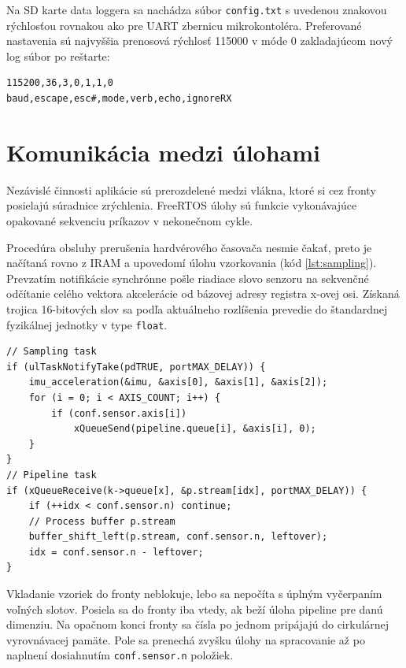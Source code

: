 Na SD karte data loggera sa nachádza súbor \verb|config.txt| s uvedenou znakovou rýchlosťou
rovnakou ako pre UART zbernicu mikrokontoléra. Preferované nastavenia sú najvyššia prenosová rýchlosť 115000
v móde 0 zakladajúcom nový log súbor po reštarte:
\begin{small}
\begin{Verbatim}[frame=single, baselinestretch=1.1]
115200,36,3,0,1,1,0
baud,escape,esc#,mode,verb,echo,ignoreRX
\end{Verbatim}
\end{small}

\section{Komunikácia medzi úlohami}
Nezávislé činnosti aplikácie sú prerozdelené medzi vlákna, ktoré si cez fronty posielajú súradnice zrýchlenia.
FreeRTOS úlohy sú funkcie vykonávajúce opakované sekvenciu príkazov v nekonečnom cykle.

Procedúra obsluhy prerušenia hardvérového časovača nesmie čakať, preto je načítaná rovno z IRAM a upovedomí úlohu vzorkovania
(kód \ref{lst:sampling}). Prevzatím notifikácie synchrónne pošle riadiace slovo senzoru na sekvenčné odčítanie celého vektora
akcelerácie od bázovej adresy registra x-ovej osi. Získaná trojica 16-bitových slov sa podľa aktuálneho rozlíšenia prevedie
do štandardnej fyzikálnej jednotky v type \verb|float|.

\begin{lstlisting}[style=cstyle,caption=Posielanie vzoriek medzi úlohami cez fronty,label={lst:sampling},
 morekeywords={ulTaskNotifyTake,xQueueSend,xQueueReceive,buffer_shift_left,p.stream}]
// Sampling task
if (ulTaskNotifyTake(pdTRUE, portMAX_DELAY)) {
	imu_acceleration(&imu, &axis[0], &axis[1], &axis[2]);
	for (i = 0; i < AXIS_COUNT; i++) {
    	if (conf.sensor.axis[i])
        	xQueueSend(pipeline.queue[i], &axis[i], 0);
    }
}
// Pipeline task
if (xQueueReceive(k->queue[x], &p.stream[idx], portMAX_DELAY)) {
	if (++idx < conf.sensor.n) continue;
    // Process buffer p.stream
    buffer_shift_left(p.stream, conf.sensor.n, leftover);
    idx = conf.sensor.n - leftover;
}
\end{lstlisting}
Vkladanie vzoriek do fronty neblokuje, lebo sa nepočíta s úplným vyčerpaním voľných slotov. Posiela sa do fronty
iba vtedy, ak beží úloha pipeline pre danú dimenziu. Na opačnom konci fronty sa čísla po jednom pripájajú do
cirkulárnej vyrovnávacej pamäte. Pole sa prenechá zvyšku úlohy na spracovanie až po naplnení
dosiahnutím \verb|conf.sensor.n| položiek.

